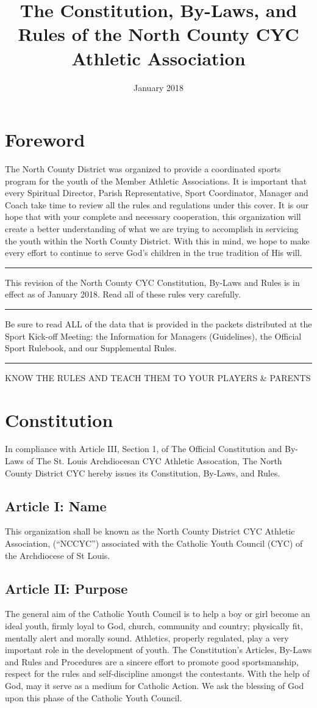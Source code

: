 \documentclass[letteraper,10pt,oneside,draft]{memoir}
\title{The Constitution, By-Laws, and Rules of the North County CYC Athletic Association}
\date{January 2018}
\author{}
\begin{document}
\maketitle

\frontmatter
\tableofcontents
\mainmatter
\chapter{Foreword}
The North County District was organized to provide a coordinated sports program for the youth of the Member Athletic Associations.  It is important that every Spiritual Director, Parish Representative, Sport Coordinator, Manager and Coach take time to review all the rules and regulations under this cover.  It is our hope that with your complete and necessary cooperation, this organization will create a better understanding of what we are trying to accomplish in servicing the youth within the North County District.  With this in mind, we hope to make every effort to continue to serve God's children in the true tradition of His will.
\plainbreak{4}
This revision of the North County CYC Constitution, By-Laws and Rules is in effect as of January 2018.  
Read all of these rules very carefully.  
\plainbreak{4}
Be sure to read ALL of the data that is provided in the packets distributed at the Sport Kick-off Meeting:  the Information for Managers (Guidelines), the Official Sport Rulebook, and our Supplemental Rules.
\plainbreak{4}
KNOW THE RULES AND TEACH THEM TO YOUR PLAYERS \& PARENTS

\chapter{Constitution}
In compliance with Article III, Section 1, of The Official Constitution and By-Laws of The St. Louis Archdiocesan CYC Athletic Assocation, The North County District CYC hereby issues its Constitution, By-Laws, and Rules.

\section[Article I: Name]{Article I: Name}
This organization shall be known as the North County District CYC Athletic Association, (“NCCYC”) associated with the Catholic Youth Council (CYC) of the Archdiocese of St Louis.

\section[Article II: Purpose]{Article II: Purpose}
The general aim of the Catholic Youth Council is to help a boy or girl become an ideal youth, firmly loyal to God, church, community and country; physically fit, mentally alert and morally sound.  Athletics, properly regulated, play a very important role in the development of youth.  The Constitution’s Articles, By-Laws and Rules and Procedures are a sincere effort to promote good sportsmanship, respect for the rules and self-discipline amongst the contestants.  With the help of God, may it serve as a medium for Catholic Action.  We ask the blessing of God upon this phase of the Catholic Youth Council.
\end{document}
